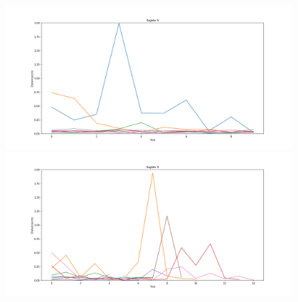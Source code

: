 \documentclass[pdf]{beamer}
\begin{document}
\begin{frame}
\begin{columns}
\begin{column}{0.4\textwidth}
		\end{column}
	\begin{column}{0.6\textwidth}
		\begin{figure}
			\centering
				\includegraphics[width=\textwidth]{sujeto5/no_force/evolution_distance}
	
				\includegraphics[width=\textwidth]{sujeto3/no_force/evolution_distance}
	
		\end{figure}
	\end{column}
	\end{columns}


\end{frame}
\end{document}
